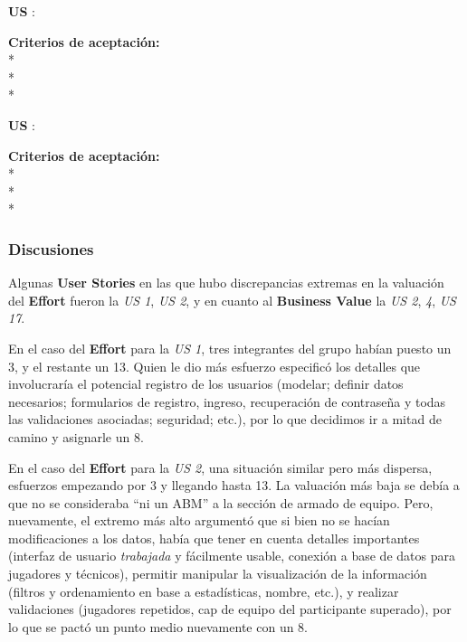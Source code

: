 \begin{tcolorbox}
\textbf{US }: %

\vline

\textbf{Criterios de aceptación:}\\
* \\ %
* \\ %
* \\ %
\end{tcolorbox}
\vspace{10pt}

\begin{tcolorbox}
\textbf{US }: %

\vline

\textbf{Criterios de aceptación:}\\
* \\ %
* \\ %
* \\ %
\end{tcolorbox}
\vspace{10pt}



\subsubsection*{Discusiones}
Algunas \textbf{User Stories} en las que hubo discrepancias extremas en la valuación del \textbf{Effort} fueron la \emph{US 1}, \emph{US 2}, y en cuanto al \textbf{Business Value} la \emph{US 2}, \emph{4}, \emph{US 17}.

En el caso del \textbf{Effort} para la \emph{US 1}, tres integrantes del grupo habían puesto un 3, y el restante un 13. Quien le dio más esfuerzo especificó los detalles que involucraría el potencial registro de los usuarios (modelar; definir datos necesarios; formularios de registro, ingreso, recuperación de contraseña y todas las validaciones asociadas; seguridad; etc.), por lo que decidimos ir a mitad de camino y asignarle un 8.

En el caso del \textbf{Effort} para la \emph{US 2}, una situación similar pero más dispersa, esfuerzos empezando por 3 y llegando hasta 13. La valuación más baja se debía a que no se consideraba ``ni un ABM'' a la sección de armado de equipo. Pero, nuevamente, el extremo más alto argumentó que si bien no se hacían modificaciones a los datos, había que tener en cuenta detalles importantes (interfaz de usuario \emph{trabajada} y fácilmente usable, conexión a base de datos para jugadores y técnicos), permitir manipular la visualización de la información (filtros y ordenamiento en base a estadísticas, nombre, etc.), y realizar validaciones (jugadores repetidos, cap de equipo del participante superado), por lo que se pactó un punto medio nuevamente con un 8.

